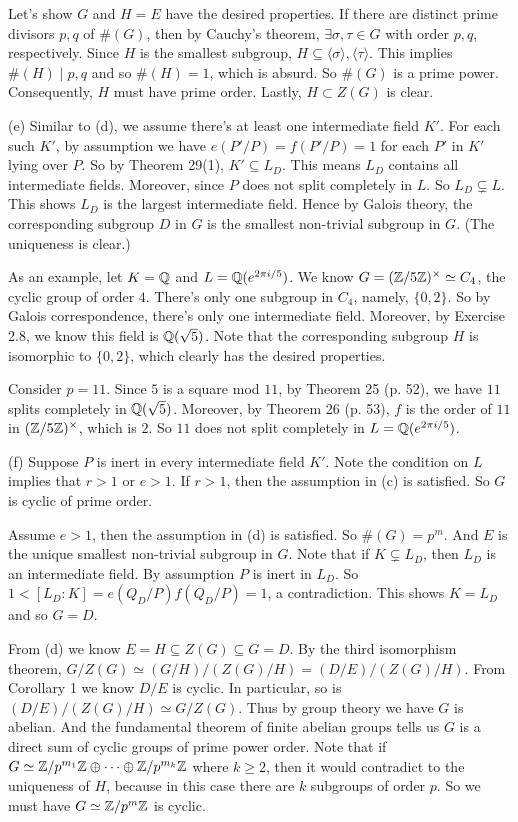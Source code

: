 \documentclass[../Marcus.tex]{subfiles}
\begin{document}
Let's show $G$ and $H=E$ have the desired properties. If there are distinct prime divisors $p,q$ of $\#(G)$, then by Cauchy's theorem, $\exists \sigma,\tau\in G$ with order $p,q$, respectively. Since $H$ is the smallest subgroup, $H\subseteq \langle\sigma\rangle,\langle\tau\rangle$. This implies $\#(H)\mid p,q$ and so $\#(H)=1$, which is absurd. So $\#(G)$ is a prime power. Consequently, $H$ must have prime order. Lastly, $H\subset Z(G)$ is clear.

(e) Similar to (d), we assume there's at least one intermediate field $K'$. For each such $K'$, by assumption we have $e(P'/P)=f(P'/P)=1$ for each $P'$ in $K'$ lying over $P$. So by Theorem 29(1), $K'\subseteq L_D$. This means $L_D$ contains all intermediate fields. Moreover, since $P$ does not split completely in $L$. So $L_D\varsubsetneq L$. This shows $L_D$ is the largest intermediate field. Hence by Galois theory, the corresponding subgroup $D$ in $G$ is the smallest non-trivial subgroup in $G$. (The uniqueness is clear.)

As an example, let $K=\mathbb{Q}$ and $L=\mathbb{Q}(e^{2\pi i/5})$. We know $G=(\mathbb{Z}/5\mathbb{Z})^\times\simeq C_4$, the cyclic group of order $4$. There's only one subgroup in $C_4$, namely, $\{0,2\}$. So by Galois correspondence, there's only one intermediate field. Moreover, by Exercise 2.8, we know this field is $\mathbb{Q}(\sqrt{5})$. Note that the corresponding subgroup $H$ is isomorphic to $\{0,2\}$, which clearly has the desired properties.

Consider $p=11$. Since $5$ is a square mod $11$, by Theorem 25 (p. 52), we have $11$ splits completely in $\mathbb{Q}(\sqrt{5})$. Moreover, by Theorem 26 (p. 53), $f$ is the order of $11$ in $(\mathbb{Z}/5\mathbb{Z})^\times$, which is $2$. So $11$ does not split completely in $L=\mathbb{Q}(e^{2\pi i/5})$.

(f) Suppose $P$ is inert in every intermediate field $K'$. Note the condition on $L$ implies that $r>1$ or $e>1$. If $r>1$, then the assumption in (c) is satisfied. So $G$ is cyclic of prime order.

Assume $e>1$, then the assumption in (d) is satisfied. So $\#(G)=p^m$. And $E$ is the unique smallest non-trivial subgroup in $G$. Note that if $K\varsubsetneq L_D$, then $L_D$ is an intermediate field. By assumption $P$ is inert in $L_D$. So $1<[L_D:K]=e(Q_D/P)f(Q_D/P)=1$, a contradiction. This shows $K=L_D$ and so $G=D$.

From (d) we know $E=H\subseteq Z(G)\subseteq G=D$. By the third isomorphism theorem, $G/Z(G) \simeq (G/H)/(Z(G)/H) = (D/E)/(Z(G)/H)$. From Corollary 1 we know  $D/E$ is cyclic. In particular, so is $(D/E)/(Z(G)/H)\simeq G/Z(G)$. Thus by group theory we have $G$ is abelian. And the fundamental theorem of finite abelian groups tells us $G$ is a direct sum of cyclic groups of prime power order. Note that if $G\simeq \mathbb{Z}/p^{m_1}\mathbb{Z}\oplus\cdots\oplus\mathbb{Z}/p^{m_k}\mathbb{Z}$ where $k\geq 2$, then it would contradict to the uniqueness of $H$, because in this case there are $k$ subgroups of order $p$. So we must have $G\simeq \mathbb{Z}/p^m\mathbb{Z}$ is cyclic.
\end{document}
